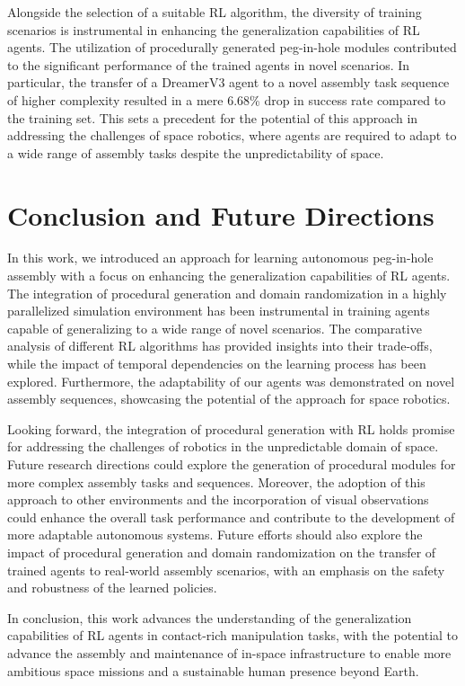 Alongside the selection of a suitable RL algorithm, the diversity of training scenarios is instrumental in enhancing the generalization capabilities of RL agents. The utilization of procedurally generated peg-in-hole modules contributed to the significant performance of the trained agents in novel scenarios. In particular, the transfer of a DreamerV3 agent to a novel assembly task sequence of higher complexity resulted in a mere 6.68\% drop in success rate compared to the training set. This sets a precedent for the potential of this approach in addressing the challenges of space robotics, where agents are required to adapt to a wide range of assembly tasks despite the unpredictability of space.


\section{Conclusion and Future Directions}\label{sec:conclusion-and-future-directions}

In this work, we introduced an approach for learning autonomous peg-in-hole assembly with a focus on enhancing the generalization capabilities of RL agents. The integration of procedural generation and domain randomization in a highly parallelized simulation environment has been instrumental in training agents capable of generalizing to a wide range of novel scenarios. The comparative analysis of different RL algorithms has provided insights into their trade-offs, while the impact of temporal dependencies on the learning process has been explored. Furthermore, the adaptability of our agents was demonstrated on novel assembly sequences, showcasing the potential of the approach for space robotics.

Looking forward, the integration of procedural generation with RL holds promise for addressing the challenges of robotics in the unpredictable domain of space. Future research directions could explore the generation of procedural modules for more complex assembly tasks and sequences. Moreover, the adoption of this approach to other environments and the incorporation of visual observations could enhance the overall task performance and contribute to the development of more adaptable autonomous systems. Future efforts should also explore the impact of procedural generation and domain randomization on the transfer of trained agents to real-world assembly scenarios, with an emphasis on the safety and robustness of the learned policies.

In conclusion, this work advances the understanding of the generalization capabilities of RL agents in contact-rich manipulation tasks, with the potential to advance the assembly and maintenance of in-space infrastructure to enable more ambitious space missions and a sustainable human presence beyond Earth.
